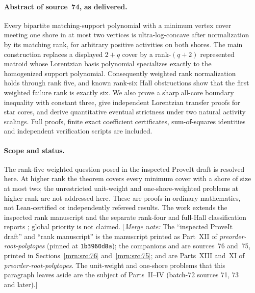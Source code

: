 \documentclass[11pt,a4paper]{article}
\theoremstyle{remark}\newtheorem{remark}[theorem]{Remark}
\newcommand{\mnote}[1]{[\textit{Merge note:} #1]}
\newcommand{\prp}{\emph{preorder-root-polytopes}}
\begin{document}
\paragraph{Abstract of source~74, as delivered.} Every bipartite matching-support polynomial with a minimum vertex cover meeting one shore in at most two vertices is ultra-log-concave after normalization by its matching rank, for arbitrary positive activities on both shores. The main construction replaces a displayed $2+q$ cover by a rank-$(q+2)$ represented matroid whose Lorentzian basis polynomial specializes exactly to the homogenized support polynomial. Consequently weighted rank normalization holds through rank five, and known rank-six Hall obstructions show that the first weighted failure rank is exactly six. We also prove a sharp all-core boundary inequality with constant three, give independent Lorentzian transfer proofs for star cores, and derive quantitative eventual strictness under two natural activity scalings. Full proofs, finite exact coefficient certificates, sum-of-squares identities and independent verification scripts are included.

\paragraph{Scope and status.}
The rank-five weighted question posed in the inspected ProveIt draft is resolved here. At higher rank the theorem covers every minimum cover with a shore of size at most two; the unrestricted unit-weight and one-shore-weighted problems at higher rank are not addressed here. These are proofs in ordinary mathematics, not Lean-certified or independently refereed results. The work extends the inspected rank manuscript and the separate rank-four and full-Hall classification reports \cite{b:RankMS,b:m76,b:m75}; global priority is not claimed.
\mnote{The ``inspected ProveIt draft'' and ``rank manuscript'' \cite{b:RankMS} is the manuscript printed as Part~XII of \prp{} (pinned at \texttt{1b3960d8a}); the companions \cite{b:m76} and \cite{b:m75} are sources~76 and~75, printed in Sections~\ref{mrn:src:76} and~\ref{mrn:src:75}; \cite{b:LeafMS} and \cite{b:HallMS} are Parts~XIII and~XI of \prp. The unit-weight and one-shore problems that this paragraph leaves aside are the subject of Parts~II--IV (batch-72 sources 71, 73 and later).}
\end{document}
